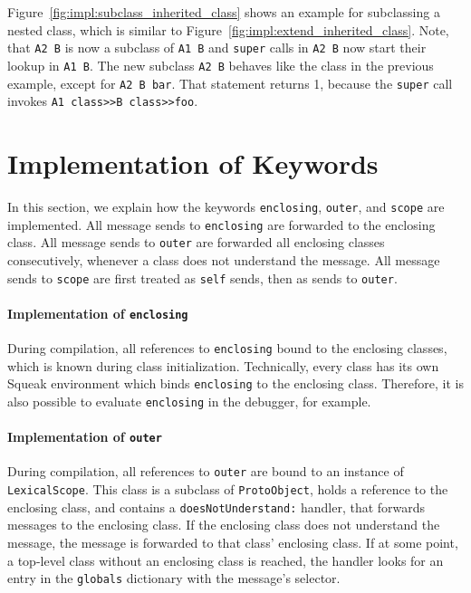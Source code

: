 Figure~\ref{fig:impl:subclass_inherited_class} shows an example for subclassing a nested class, which is similar to Figure~\ref{fig:impl:extend_inherited_class}. Note, that \texttt{A2 B} is now a subclass of \texttt{A1 B} and \texttt{super} calls in \texttt{A2 B} now start their lookup in \texttt{A1 B}. The new subclass \texttt{A2 B} behaves like the class in the previous example, except for \texttt{A2 B bar}. That statement returns 1, because the \texttt{super} call invokes \texttt{A1 class>>B class>>foo}.

\section{Implementation of Keywords}
\label{sec:impl_keywords}
In this section, we explain how the keywords \texttt{enclosing}, \texttt{outer}, and \texttt{scope} are implemented. All message sends to \texttt{enclosing} are forwarded to the enclosing class. All message sends to \texttt{outer} are forwarded all enclosing classes consecutively, whenever a class does not understand the message. All message sends to \texttt{scope} are first treated as \texttt{self} sends, then as sends to \texttt{outer}.

\paragraph{Implementation of \texttt{enclosing}}
During compilation, all references to \texttt{enclosing} bound to the enclosing classes, which is known during class initialization. Technically, every class has its own Squeak environment which binds \texttt{enclosing} to the enclosing class. Therefore, it is also possible to evaluate \texttt{enclosing} in the debugger, for example.

\paragraph{Implementation of \texttt{outer}}
During compilation, all references to \texttt{outer} are bound to an instance of \texttt{LexicalScope}. This class is a subclass of \texttt{ProtoObject}, holds a reference to the enclosing class, and contains a \texttt{doesNotUnderstand:} handler, that forwards messages to the enclosing class. If the enclosing class does not understand the message, the message is forwarded to that class' enclosing class. If at some point, a top-level class without an enclosing class is reached, the handler looks for an entry in the \texttt{globals} dictionary with the message's selector.

